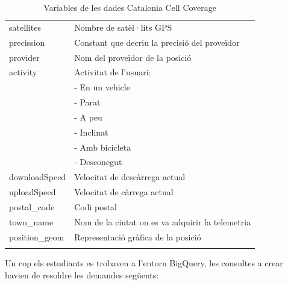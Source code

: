 \documentclass[11pt,longbibliography]{article}
\theoremstyle{definition}
\theoremstyle{remark}
\begin{document}
\begin{longtable}[H]{p{} | p{} }
satellites        & Nombre de satèl·lits GPS                         \\
precission        & Constant que decriu la precisió del proveïdor    \\
provider          & Nom del proveïdor de la posició                  \\
activity          & Activitat de l'usuari:                           \\
                  & - En un vehicle                                  \\
                  & - Parat                                          \\
                  & - A peu                                          \\
                  & - Inclinat                                       \\
                  & - Amb bicicleta                                  \\
                  & - Desconegut                                     \\
downloadSpeed     & Velocitat de descàrrega actual                   \\
uploadSpeed       & Velocitat de càrrega actual                      \\
postal\_code      & Codi postal                                      \\
town\_name        & Nom de la ciutat on es va adquirir la telemetria \\
position\_geom    & Representació gràfica de la posició         \\
\caption{Variables de les dades Catalonia Cell Coverage}
\label{tab:CCC}
\end{longtable}

Un cop els estudiants es trobaven a l'entorn BigQuery, les consultes a crear havien de resoldre les demandes següents:
\end{document}
